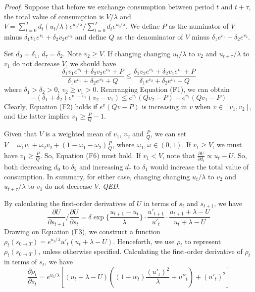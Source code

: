 \noindent \emph{Proof}: Suppose that before we exchange consumption
between period \(t\) and \(t+\tau\), the total value of consumption is
\(V/\lambda\) and
\(V=\sum_{t=0}^Td_t(u_t/\lambda)e^{u_t/\lambda}/\sum_{t=0}^Td_te^{u_t/\lambda}\).
We define \(P\) as the numinator of \(V\) minus
\(\delta_1v_1e^{v_1}+\delta_2v_2e^{v_2}\) and define \(Q\) as the
denominator of \(V\) minus \(\delta_1e^{v_1}+\delta_2e^{v_2}\).

Set \(d_0=\delta_1\), \(d_\tau=\delta_2\). Note \(v_2\geq V\). If
changing changing \(u_t/\lambda\) to \(v_2\) and \(u_{t+\tau}/\lambda\)
to \(v_1\) do not decrease \(V\), we should have
\[\tag{F1} \frac{\delta_1v_1e^{v_1}+ \delta_2v_2e^{v_2}+P}{\delta_1e^{v_1}+\delta_2e^{v_2}+Q} \leq  \frac{\delta_1v_2e^{v_2}+ \delta_2v_1e^{v_1}+P}{\delta_1e^{v_2}+\delta_2e^{v_1}+Q} \]where
\(\delta_1>\delta_2>0\), \(v_2\geq v_1>0\). Rearranging Equation (F1),
we can
obtain\[\tag{F2} -(\delta_1+\delta_2)e^{v_1+v_2}(v_2-v_1)\leq e^{v_2}(Qv_2-P)-e^{v_1}(Qv_1-P) \]Clearly,
Equation (F2) holds if \(e^v(Qv-P)\) is increasing in \(v\) when
\(v\in[v_1,v_2]\), and the latter implies \(v_1\geq \frac{P}{Q}-1\).

Given that \(V\) is a weighted mean of \(v_1\), \(v_2\) and
\(\frac{P}{Q}\), we can set
\(V=\omega_1v_1+\omega_2v_2+(1-\omega_1-\omega_2)\frac{P}{Q}\), where
\(\omega_1,\omega\in(0,1)\). If \(v_1\geq V\), we must have
\(v_1\geq \frac{P}{Q}\). So, Equation (F6) must hold. If \(v_1<V\), note
that \(\frac{\partial U}{\partial d_t}\propto u_t-U\). So, both
decreasing \(d_0\) to \(\delta_2\) and increasing \(d_\tau\) to
\(\delta_1\) would increase the total value of consumption. In summary,
for either case, changing changing \(u_t/\lambda\) to \(v_2\) and
\(u_{t+\tau}/\lambda\) to \(v_1\) do not decrease \(V\). \emph{QED}.

By calculating the first-order derivatives of \(U\) in terms of \(s_t\)
and \(s_{t+1}\), we have\[\tag{F3}
\frac{\partial U}{\partial s_{t+1}}/\frac{\partial U}{\partial s_t} = 
\delta \exp\{\frac{u_{t+1}-u_t}{\lambda}\}
\cdot\frac{u'_{t+1}}{u'_t}
\cdot\frac{u_{t+1}+\lambda-U}{u_t+\lambda-U}
\]Drawing on Equation (F3), we construct a function
\(\rho_t(s_{0\rightarrow T})=e^{u_t/\lambda}u'_t(u_t+\lambda-U)\).
Henceforth, we use \(\rho_t\) to represent
\(\rho_t(s_{0\rightarrow T})\), unless otherwise specified. Calculating
the first-order derivative of \(\rho_t\) in terms of \(s_t\), we
have\[\tag{F4}
\frac{\partial \rho_t}{\partial s_t} = 
e^{u_t/\lambda}[
(u_t+\lambda-U)((1-w_t)\frac{(u'_t)^2}{\lambda}+u''_t)
+(u'_t)^2]
\]

